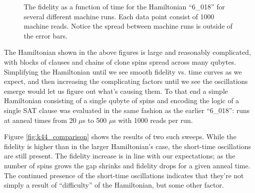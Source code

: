 \begin{figure}
	\caption[Short Time Fidelities]{The fidelity as a function of time for the Hamiltonian ``6\_018'' for several different machine runs.  Each data point consist of 1000 machine reads.  Notice the spread between machine runs is outside of the error bars.}
	\label{fig:short_fidelity}
\end{figure}

The Hamiltonian shown in the above figures is large and reasonably complicated, with blocks of clauses and chains of clone spins spread across many qubytes.  Simplifying the Hamiltonian until we see smooth fidelity vs. time curves as we expect, and then increasing the complicating factors until we see the oscillations emerge would let us figure out what's causing them.  To that end a simple Hamiltonian consisting of a single qubyte of spins and encoding the logic of a single SAT clause was evaluated in the same fashion as the earlier ``6\_018'': runs at anneal times from 20 $\mu$s to 500 $\mu$s with 1000 reads per run.  

Figure \ref{fig:k44_comparison} shows the results of two such sweeps.  While the fidelity is higher than in the larger Hamiltonian's case, the short-time oscillations are still present.  The fidelity increase is in line with our expectations; as the number of spins grows the gap shrinks and fidelity drops for a given anneal time.  The continued presence of the short-time oscillations indicates that they're not simply a result of ``difficulty'' of the Hamiltonian, but some other factor.


